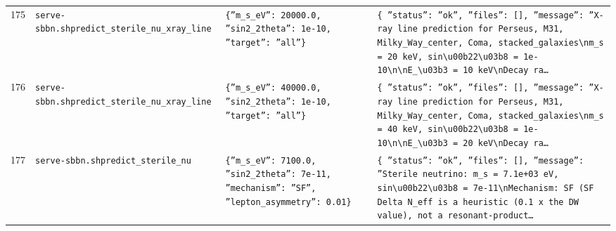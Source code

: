 \documentclass[11pt,a4paper]{article}
\begin{document}
\begin{longtable}{@{}p{}p{}p{}p{}@{}}
175 & \texttt{serve-sbbn.sh}\newline\texttt{predict\_\allowbreak{}sterile\_\allowbreak{}nu\_\allowbreak{}xray\_\allowbreak{}line} & \texttt{\{''m\_\allowbreak{}s\_\allowbreak{}eV'':\allowbreak{} 20000.0,\allowbreak{} ''sin2\_\allowbreak{}2theta'':\allowbreak{} 1e-10,\allowbreak{} ''target'':\allowbreak{} ''all''\}\allowbreak{}} & \texttt{\{   ''status'':\allowbreak{} ''ok'',\allowbreak{}   ''files'':\allowbreak{} []\allowbreak{},\allowbreak{}   ''message'':\allowbreak{} ''X-ray line prediction for Perseus,\allowbreak{} M31,\allowbreak{} Milky\_\allowbreak{}Way\_\allowbreak{}center,\allowbreak{} Coma,\allowbreak{} stacked\_\allowbreak{}galaxies\textbackslash{}\allowbreak{}nm\_\allowbreak{}s =\allowbreak{} 20 keV,\allowbreak{} sin\textbackslash{}\allowbreak{}u00b22\textbackslash{}\allowbreak{}u03b8 =\allowbreak{} 1e-10\textbackslash{}\allowbreak{}n\textbackslash{}\allowbreak{}nE\_\allowbreak{}\textbackslash{}\allowbreak{}u03b3 =\allowbreak{} 10 keV\textbackslash{}\allowbreak{}nDecay ra\ldots{}\allowbreak{}} \\
176 & \texttt{serve-sbbn.sh}\newline\texttt{predict\_\allowbreak{}sterile\_\allowbreak{}nu\_\allowbreak{}xray\_\allowbreak{}line} & \texttt{\{''m\_\allowbreak{}s\_\allowbreak{}eV'':\allowbreak{} 40000.0,\allowbreak{} ''sin2\_\allowbreak{}2theta'':\allowbreak{} 1e-10,\allowbreak{} ''target'':\allowbreak{} ''all''\}\allowbreak{}} & \texttt{\{   ''status'':\allowbreak{} ''ok'',\allowbreak{}   ''files'':\allowbreak{} []\allowbreak{},\allowbreak{}   ''message'':\allowbreak{} ''X-ray line prediction for Perseus,\allowbreak{} M31,\allowbreak{} Milky\_\allowbreak{}Way\_\allowbreak{}center,\allowbreak{} Coma,\allowbreak{} stacked\_\allowbreak{}galaxies\textbackslash{}\allowbreak{}nm\_\allowbreak{}s =\allowbreak{} 40 keV,\allowbreak{} sin\textbackslash{}\allowbreak{}u00b22\textbackslash{}\allowbreak{}u03b8 =\allowbreak{} 1e-10\textbackslash{}\allowbreak{}n\textbackslash{}\allowbreak{}nE\_\allowbreak{}\textbackslash{}\allowbreak{}u03b3 =\allowbreak{} 20 keV\textbackslash{}\allowbreak{}nDecay ra\ldots{}\allowbreak{}} \\
177 & \texttt{serve-sbbn.sh}\newline\texttt{predict\_\allowbreak{}sterile\_\allowbreak{}nu} & \texttt{\{''m\_\allowbreak{}s\_\allowbreak{}eV'':\allowbreak{} 7100.0,\allowbreak{} ''sin2\_\allowbreak{}2theta'':\allowbreak{} 7e-11,\allowbreak{} ''mechanism'':\allowbreak{} ''SF'',\allowbreak{} ''lepton\_\allowbreak{}asymmetry'':\allowbreak{} 0.01\}\allowbreak{}} & \texttt{\{   ''status'':\allowbreak{} ''ok'',\allowbreak{}   ''files'':\allowbreak{} []\allowbreak{},\allowbreak{}   ''message'':\allowbreak{} ''Sterile neutrino:\allowbreak{} m\_\allowbreak{}s =\allowbreak{} 7.1e+03 eV,\allowbreak{} sin\textbackslash{}\allowbreak{}u00b22\textbackslash{}\allowbreak{}u03b8 =\allowbreak{} 7e-11\textbackslash{}\allowbreak{}nMechanism:\allowbreak{} SF (SF Delta N\_\allowbreak{}eff is a heuristic (0.1 x the DW value)\allowbreak{},\allowbreak{} not a resonant-product\ldots{}\allowbreak{}} \\

\end{longtable}
\end{document}
